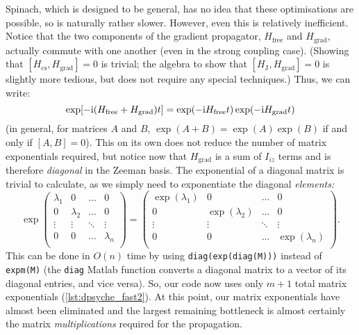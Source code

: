 Spinach, which is designed to be general, has no idea that these optimisations are possible, so is naturally rather slower.
However, even this is relatively inefficient.
Notice that the two components of the gradient propagator, $H_\text{free}$ and $H_\text{grad}$, actually commute with one another (even in the strong coupling case).
(Showing that $[H_\text{cs}, H_\text{grad}] = 0$ is trivial; the algebra to show that $[H_\text{J}, H_\text{grad}] = 0$ is slightly more tedious, but does not require any special techniques.)
Thus, we can write:
\begin{equation}
    \label{eq:split_propagator}
    \exp[-\mathrm{i}(H_\text{free} + H_\text{grad}) t] = \exp(-\mathrm{i} H_\text{free} t) \exp(-\mathrm{i} H_\text{grad} t)
\end{equation}
(in general, for matrices $A$ and $B$, $\exp(A + B) = \exp(A)\exp(B)$ if and only if $[A, B] = 0$).
This on its own does not reduce the number of matrix exponentials required, but notice now that $H_\text{grad}$ is a sum of $I_{iz}$ terms and is therefore \textit{diagonal} in the Zeeman basis.
The exponential of a diagonal matrix is trivial to calculate, as we simply need to exponentiate the diagonal \textit{elements:}
\begin{equation}
    \label{eq:expm_diagonal}
    \exp
    \begin{pmatrix}
        \lambda_1 & 0 & \ldots & 0 \\
        0 & \lambda_2 & \ldots & 0 \\
        \vdots & \vdots & \ddots & \vdots \\
        0 & 0 & \ldots & \lambda_n \\
    \end{pmatrix}
    = 
    \begin{pmatrix}
        \exp(\lambda_1) & 0 & \ldots & 0 \\
        0 & \exp(\lambda_2) & \ldots & 0 \\
        \vdots & \vdots & \ddots & \vdots \\
        0 & 0 & \ldots & \exp(\lambda_n) \\
    \end{pmatrix}.
\end{equation}
This can be done in $O(n)$ time by using \texttt{diag(exp(diag(M)))} instead of \texttt{expm(M)} (the \texttt{diag} Matlab function converts a diagonal matrix to a vector of its diagonal entries, and vice versa).
So, our code now uses only $m + 1$ total matrix exponentials (\cref{lst:dpsyche_fast2}).
At this point, our matrix exponentials have almost been eliminated and the largest remaining bottleneck is almost certainly the matrix \textit{multiplications} required for the propagation.
